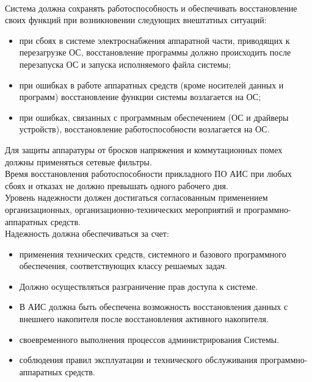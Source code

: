 \documentclass[russian, utf8, 12pt,pointsubsection,floatsubsection]{eskdtext}
\begin{document}
\\
Система должна сохранять работоспособность и обеспечивать восстановление своих функций при возникновении следующих внештатных ситуаций:
\begin{itemize}
    \item при сбоях в системе электроснабжения аппаратной части, приводящих к перезагрузке ОС, восстановление программы должно происходить после перезапуска ОС и запуска исполняемого файла системы;
    \item при ошибках в работе аппаратных средств (кроме носителей данных и программ) восстановление функции системы возлагается на ОС;
    \item при ошибках, связанных с программным обеспечением (ОС и драйверы устройств), восстановление работоспособности возлагается на ОС.
\end{itemize}

Для защиты аппаратуры от бросков напряжения и коммутационных
помех должны применяться сетевые фильтры.\\
Время восстановления работоспособности прикладного ПО АИС при любых сбоях и отказах не должно превышать одного рабочего дня.\\
Уровень надежности должен достигаться согласованным применением	организационных,	организационно-технических мероприятий и программно-аппаратных средств.\\

Надежность должна обеспечиваться за счет:
\begin{itemize}
    \item применения технических средств, системного и базового программного обеспечения, соответствующих классу решаемых задач.
    \item Должно осуществляться разграничение прав доступа к системе.
    \item В АИС должна быть обеспечена возможность восстановления данных с внешнего накопителя после восстановления активного накопителя.
    \item своевременного выполнения процессов администрирования Системы.
    \item соблюдения правил эксплуатации и технического обслуживания программно-аппаратных средств.
\end{itemize}
\end{document}
